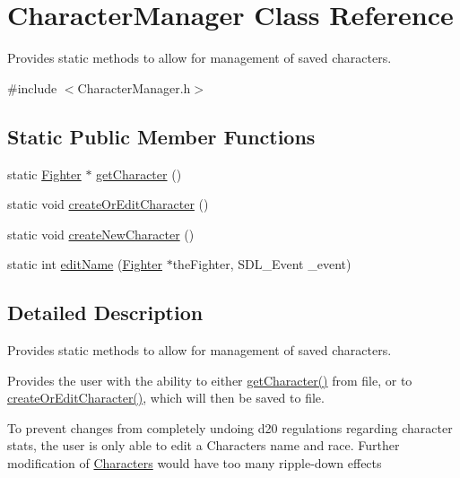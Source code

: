 \hypertarget{class_character_manager}{}\section{Character\+Manager Class Reference}
\label{class_character_manager}


Provides static methods to allow for management of saved characters.  




{\ttfamily \#include $<$Character\+Manager.\+h$>$}

\subsection*{Static Public Member Functions}
\begin{DoxyCompactItemize}
\item 
static \hyperlink{class_fighter}{Fighter} $\ast$ \hyperlink{class_character_manager_a2b13fedd6c3913ae52a9be8051300276}{get\+Character} ()
\item 
static void \hyperlink{class_character_manager_adec8bcfbce9bbb46052655e75d8f496f}{create\+Or\+Edit\+Character} ()
\item 
static void \hyperlink{class_character_manager_a0ca49607713616f15b70b12df1597100}{create\+New\+Character} ()
\item 
static int \hyperlink{class_character_manager_a185baadd16768d6b81386c7987593c5a}{edit\+Name} (\hyperlink{class_fighter}{Fighter} $\ast$the\+Fighter, S\+D\+L\+\_\+\+Event \+\_\+event)
\end{DoxyCompactItemize}


\subsection{Detailed Description}
Provides static methods to allow for management of saved characters. 

Provides the user with the ability to either \hyperlink{class_character_manager_a2b13fedd6c3913ae52a9be8051300276}{get\+Character()} from file, or to \hyperlink{class_character_manager_adec8bcfbce9bbb46052655e75d8f496f}{create\+Or\+Edit\+Character()}, which will then be saved to file. 

To prevent changes from completely undoing d20 regulations regarding character stats, the user is only able to edit a Character\textquotesingle{}s name and race. Further modification of \hyperlink{class_characters}{Characters} would have too many ripple-\/down effects 

